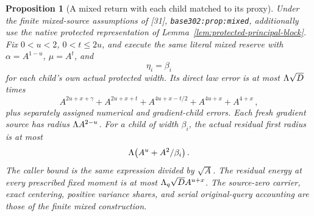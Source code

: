 \documentclass[11pt]{article}
\numberwithin{equation}{section}
\newtheorem{proposition}[theorem]{Proposition}
\theoremstyle{remark}\newtheorem{remark}[theorem]{Remark}
\newcommand{\src}[1]{\texttt{\nolinkurl{#1}}}
\begin{document}
\begin{proposition}[A mixed return with each child matched to its proxy]
\label{prop:matched-mixed}
Under the finite mixed-source assumptions of [31],
\src{base302:prop:mixed}, additionally use the native protected
representation of Lemma~\ref{lem:protected-principal-block}.
Fix $0<u<2$, $0<t\le2u$, and execute the same literal mixed reserve
with $\alpha=A^{1-u}$, $\mu=A^t$, and
\begin{equation}\label{eq:individual-matched-width}
 \eta_i=\beta_i
\end{equation}
for each child's own actual protected width. Its direct law error
is at most $\Lambda\sqrt D$ times
\begin{equation}\label{eq:matched-mixed-errors}
 A^{2u+x+\gamma}+A^{2u+x+t}
       +A^{4u+x-t/2}+A^{4u+x}+A^{4+x}\,,
\end{equation}
plus separately assigned numerical and gradient-child errors.
Each fresh gradient source has radius $\Lambda A^{2-u}$.
For a child of width $\beta_i$, the actual residual first radius
is at most
\begin{equation}\label{eq:matched-mixed-first}
 \Lambda\bigl(A^u+A^2/\beta_i\bigr)\,.
\end{equation}
The caller bound is the same expression divided by $\sqrt A$.
The residual energy at every prescribed fixed moment is at most
$\Lambda_q\sqrt D A^{u+x}$. The source-zero carrier, exact centering,
positive variance shares, and serial original-query accounting are
those of the finite mixed construction.
\end{proposition}
\end{document}
